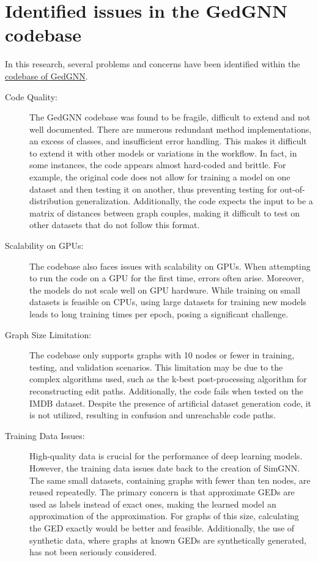 \documentclass[../Thesis.tex]{subfiles}
\begin{document}
\section{Identified issues in the GedGNN codebase}
\label{sec:issues-codebase}

 In this research, several problems and concerns have been identified within the \href{https://github.com/ChengzhiPiao/GEDGNN}{codebase of GedGNN}.

\begin{description}
    \item[Code Quality:] The GedGNN codebase was found to be fragile, difficult to extend and not well documented. There are numerous redundant method implementations, an excess of classes, and insufficient error handling. This makes it difficult to extend it with other models or variations in the workflow. In fact, in some instances, the code appears almost hard-coded and brittle. For example, the original code does not allow for training a model on one dataset and then testing it on another, thus preventing testing for out-of-distribution generalization. Additionally, the code expects the input to be a matrix of distances between graph couples, making it difficult to test on other datasets that do not follow this format.
    \item[Scalability on GPUs:] The codebase also faces issues with scalability on GPUs. When attempting to run the code on a GPU for the first time, errors often arise. Moreover, the models do not scale well on GPU hardware. While training on small datasets is feasible on CPUs, using large datasets for training new models leads to long training times per epoch, posing a significant challenge.
    \item[Graph Size Limitation:] The codebase only supports graphs with 10 nodes or fewer in training, testing, and validation scenarios. This limitation may be due to the complex algorithms used, such as the k-best post-processing algorithm for reconstructing edit paths. Additionally, the code fails when tested on the IMDB dataset. Despite the presence of artificial dataset generation code, it is not utilized, resulting in confusion and unreachable code paths.
    \item[Training Data Issues:] High-quality data is crucial for the performance of deep learning models. However, the training data issues date back to the creation of SimGNN. The same small datasets, containing graphs with fewer than ten nodes, are reused repeatedly. The primary concern is that approximate GEDs are used as labels instead of exact ones, making the learned model an approximation of the approximation. For graphs of this size, calculating the GED exactly would be better and feasible. Additionally, the use of synthetic data, where graphs at known GEDs are synthetically generated, has not been seriously considered.

\end{description}
\end{document}
